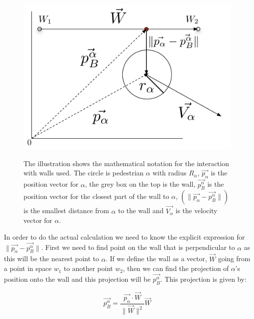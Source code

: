 \begin{figure}[ht]
\centering
{\includegraphics[scale=0.35]{Figures/NotationOfWall.pdf}} 
\caption[Notation of the interaction between an pedestrian and a wall]{The illustration shows the mathematical notation for the interaction with walls used. The circle is pedestrian $\alpha$ with radius $R_{\alpha}$, $\overrightarrow{p_{\alpha}}$ is the position vector for $\alpha$, the grey box on the top is the wall, $\overrightarrow{p_{B}^{\alpha}}$ is the position vector for the closest part of the wall to $\alpha$, $\left( \| \overrightarrow{p_{\alpha}} - \overrightarrow{p_{B}^{\alpha}} \| \right)$ is the smallest distance from $\alpha$ to the wall and $\overrightarrow{V_{\alpha}}$ is the velocity vector for $\alpha$.}
\label{NotationOfWall}
\end{figure}

In order to do the actual calculation we need to know the explicit expression for 
$ \| \overrightarrow{p_{\alpha}} - \overrightarrow{p_{B}^{\alpha}} \|$. First we need to find point on the wall 
that is perpendicular to $\alpha$ as this will be the nearest point to $\alpha$. If we define 
the wall as a vector, $\overrightarrow{W}$ going from a point in space $w_1$ to another point $w_2$, then 
we can find the projection of $\alpha$'s position onto the wall and this projection will be 
$\overrightarrow{p_{B}^{\alpha}}$. This projection is given by:

\begin{equation}\label{wall}
\overrightarrow{p_{B}^{\alpha}}=\frac{\overrightarrow{p_{\alpha}}\cdot \overrightarrow{W}}{\| \overrightarrow{W} \|^2}\overrightarrow{W}
\end{equation}

